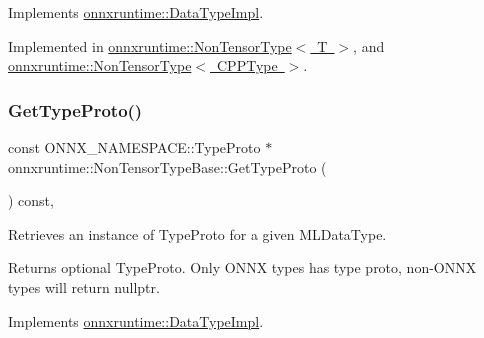 Implements \mbox{\hyperlink{classonnxruntime_1_1DataTypeImpl_affe669c89722b1eb854f31d061a60e46}{onnxruntime\+::\+Data\+Type\+Impl}}.



Implemented in \mbox{\hyperlink{classonnxruntime_1_1NonTensorType_a5220a1a535891fcb0079befd7391062f}{onnxruntime\+::\+Non\+Tensor\+Type$<$ T $>$}}, and \mbox{\hyperlink{classonnxruntime_1_1NonTensorType_a5220a1a535891fcb0079befd7391062f}{onnxruntime\+::\+Non\+Tensor\+Type$<$ C\+P\+P\+Type $>$}}.

\mbox{\label{classonnxruntime_1_1NonTensorTypeBase_a374c7577231883af5e7534c948587bf8}} 
\subsubsection{\texorpdfstring{Get\+Type\+Proto()}{GetTypeProto()}}
{\footnotesize\ttfamily const O\+N\+N\+X\+\_\+\+N\+A\+M\+E\+S\+P\+A\+C\+E\+::\+Type\+Proto $\ast$ onnxruntime\+::\+Non\+Tensor\+Type\+Base\+::\+Get\+Type\+Proto (\begin{DoxyParamCaption}{ }\end{DoxyParamCaption}) const\hspace{0.3cm}{\ttfamily [override]}, {\ttfamily [virtual]}}



Retrieves an instance of Type\+Proto for a given M\+L\+Data\+Type. 

\begin{DoxyReturn}{Returns}
optional Type\+Proto. Only O\+N\+NX types has type proto, non-\/\+O\+N\+NX types will return nullptr. 
\end{DoxyReturn}


Implements \mbox{\hyperlink{classonnxruntime_1_1DataTypeImpl_a9bea0ebb8f0d94ed5a1b541c160fa33a}{onnxruntime\+::\+Data\+Type\+Impl}}.

\mbox{\label{classonnxruntime_1_1NonTensorTypeBase_a1a6bfbb79b25f000e83106d79dd04c83}} 
